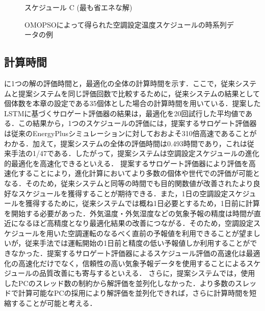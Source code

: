 \begin{figure}[htbp]
\begin{center}
\begin{minipage}{0.45\textwidth}
\begin{center}
        {\small スケジュール C (最も省エネな解)}
      \end{center}
    \end{minipage}
    \vspace{-1mm}
    \caption{OMOPSOによって得られた空調設定温度スケジュールの時系列データの例}
    \label{fig::surrogate_result_schedule}
  \end{center}
\end{figure}


\subsection{計算時間}
に1つの解の評価時間と，最適化の全体の計算時間を示す．ここで，従来システムと提案システムを同じ評価回数で比較するために，従来システムの結果として個体数を本章の設定である35個体とした場合の計算時間を用いている．提案したLSTMに基づくサロゲート評価器の結果は，最適化を20回試行した平均値である．この結果から，1つのスケジュールの評価には，提案するサロゲート評価器は従来のEnergyPlusシミュレーションに対しておおよそ310倍高速であることがわかる．加えて，提案システムの全体の評価時間は0.493時間であり，これは従来手法の1/47である．したがって，提案システムは空調設定スケジュールの進化的最適化を高速化できるといえる．
提案するサロゲート評価器により評価を高速化することにより，進化計算においてより多数の個体や世代での評価が可能となる．そのため，従来システムと同等の時間でも目的関数値が改善されたより良好なスケジュールを獲得することが期待できる．また，1日の空調設定スケジュールを獲得するために，従来システムでは概ね1日必要とするため，1日前に計算を開始する必要があった．外気温度・外気湿度などの気象予報の精度は時間が直近になるほど高精度となり最適化結果の改善につながる．そのため，空調設定スケジュールを用いた空調運転のなるべく直前の予報値を利用できることが望ましいが，従来手法では運転開始の1日前と精度の低い予報値しか利用することができなかった．提案するサロゲート評価器によるスケジュール評価の高速化は最適化の高速化だけでなく，信頼性の高い気象予報データを使用することによるスケジュールの品質改善にも寄与するといえる．
さらに，提案システムでは，使用したPCのスレッド数の制約から解評価を並列化しなかった．より多数のスレッドで計算可能なPCの採用により解評価を並列化できれば，さらに計算時間を短縮することが可能と考える．

